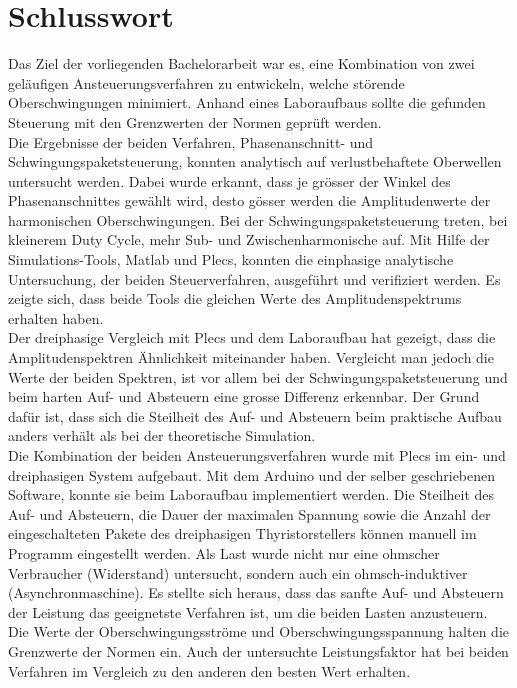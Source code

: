 \section{Schlusswort}
Das Ziel der vorliegenden Bachelorarbeit war es, eine Kombination von zwei geläufigen Ansteuerungsverfahren zu entwickeln, welche störende Oberschwingungen minimiert. Anhand eines Laboraufbaus sollte die gefunden Steuerung mit den Grenzwerten der Normen geprüft werden.\\ 
Die Ergebnisse der beiden Verfahren, Phasenanschnitt- und Schwingungspaketsteuerung, konnten analytisch auf verlustbehaftete Oberwellen untersucht werden. Dabei wurde erkannt, dass je grösser der Winkel des Phasenanschnittes gewählt wird, desto gösser werden die Amplitudenwerte der harmonischen Oberschwingungen. Bei der Schwingungspaketsteuerung treten, bei kleinerem Duty Cycle, mehr Sub- und Zwischenharmonische auf. Mit Hilfe der Simulations-Tools, Matlab und Plecs, konnten die einphasige analytische Untersuchung, der beiden Steuerverfahren, ausgeführt und verifiziert werden. Es zeigte sich, dass beide Tools die gleichen Werte des Amplitudenspektrums erhalten haben.\\ 
Der dreiphasige Vergleich mit Plecs und dem Laboraufbau hat gezeigt, dass die Amplitudenspektren Ähnlichkeit miteinander haben. Vergleicht man jedoch die Werte der beiden Spektren, ist vor allem bei der Schwingungspaketsteuerung und beim harten Auf- und Absteuern eine grosse Differenz erkennbar. Der Grund dafür ist, dass sich die Steilheit des Auf- und Absteuern beim praktische Aufbau anders verhält als bei der theoretische Simulation.\\
Die Kombination der beiden Ansteuerungsverfahren wurde mit Plecs im ein- und dreiphasigen System aufgebaut. Mit dem Arduino und der selber geschriebenen Software, konnte sie beim Laboraufbau implementiert werden. Die Steilheit des Auf- und Absteuern, die Dauer der maximalen Spannung sowie die Anzahl der eingeschalteten Pakete des dreiphasigen Thyristorstellers können manuell im Programm eingestellt werden. 
Als Last wurde nicht nur eine ohmscher Verbraucher (Widerstand) untersucht, sondern auch ein ohmsch-induktiver (Asynchronmaschine). Es stellte sich heraus, dass das sanfte Auf- und Absteuern der Leistung das geeignetste Verfahren ist, um die beiden Lasten anzusteuern. Die Werte der Oberschwingungsströme und Oberschwingungsspannung halten die Grenzwerte der Normen ein. Auch der untersuchte Leistungsfaktor hat bei beiden Verfahren im Vergleich zu den anderen den besten Wert erhalten.\\
